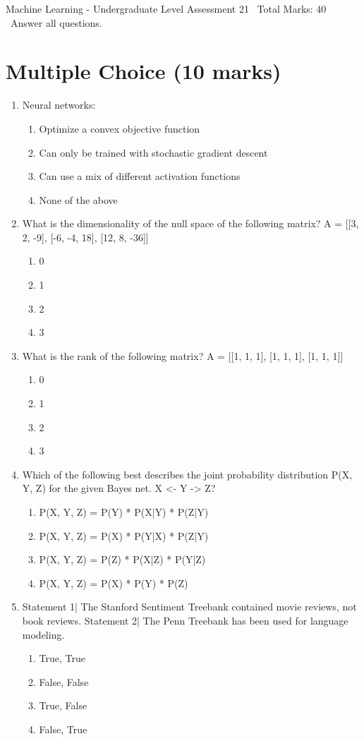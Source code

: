 \documentclass[12pt]{article}
\begin{document}
\begin{center}
Machine Learning - Undergraduate Level Assessment 21 \
Total Marks: 40 \
Answer all questions.
\end{center}

\section*{Multiple Choice (10 marks)}
\begin{enumerate}[label=\arabic*.]
\item Neural networks:
\begin{enumerate}[label=(\alph*)]
    \item Optimize a convex objective function
    \item Can only be trained with stochastic gradient descent
    \item Can use a mix of different activation functions
    \item None of the above
\end{enumerate}
\item What is the dimensionality of the null space of the following matrix? A = [[3, 2, -9], [-6, -4, 18], [12, 8, -36]]
\begin{enumerate}[label=(\alph*)]
    \item 0
    \item 1
    \item 2
    \item 3
\end{enumerate}
\item What is the rank of the following matrix? A = [[1, 1, 1], [1, 1, 1], [1, 1, 1]]
\begin{enumerate}[label=(\alph*)]
    \item 0
    \item 1
    \item 2
    \item 3
\end{enumerate}
\item Which of the following best describes the joint probability distribution P(X, Y, Z) for the given Bayes net. X \textless{}- Y -\textgreater{} Z?
\begin{enumerate}[label=(\alph*)]
    \item P(X, Y, Z) = P(Y) * P(X|Y) * P(Z|Y)
    \item P(X, Y, Z) = P(X) * P(Y|X) * P(Z|Y)
    \item P(X, Y, Z) = P(Z) * P(X|Z) * P(Y|Z)
    \item P(X, Y, Z) = P(X) * P(Y) * P(Z)
\end{enumerate}
\item Statement 1| The Stanford Sentiment Treebank contained movie reviews, not book reviews. Statement 2| The Penn Treebank has been used for language modeling.
\begin{enumerate}[label=(\alph*)]
    \item True, True
    \item False, False
    \item True, False
    \item False, True
\end{enumerate}
\end{enumerate}
\end{document}

